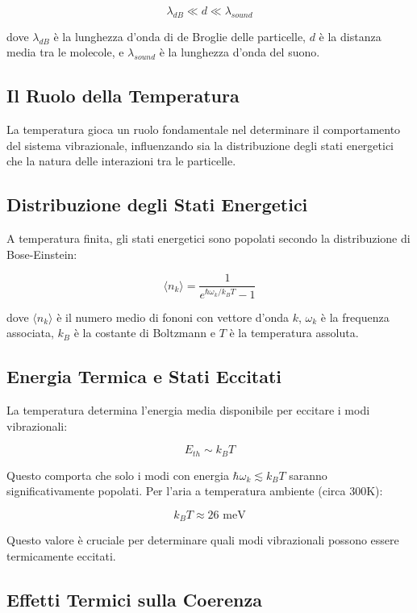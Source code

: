 \documentclass{gs-adonis}
\begin{document}
\[\lambda_{dB} \ll d \ll \lambda_{sound}\]

dove \(\lambda_{dB}\) è la lunghezza d'onda di de Broglie delle
particelle, \(d\) è la distanza media tra le molecole, e
\(\lambda_{sound}\) è la lunghezza d'onda del suono.

\subsection{Il Ruolo della
Temperatura}\label{il-ruolo-della-temperatura}

La temperatura gioca un ruolo fondamentale nel determinare il
comportamento del sistema vibrazionale, influenzando sia la
distribuzione degli stati energetici che la natura delle interazioni tra
le particelle.

\subsection{Distribuzione degli Stati
Energetici}\label{distribuzione-degli-stati-energetici}

A temperatura finita, gli stati energetici sono popolati secondo la
distribuzione di Bose-Einstein:

\[\langle n_k \rangle = \frac{1}{e^{\hbar\omega_k/k_BT} - 1}\]

dove \(\langle n_k \rangle\) è il numero medio di fononi con vettore
d'onda \(k\), \(\omega_k\) è la frequenza associata, \(k_B\) è la
costante di Boltzmann e \(T\) è la temperatura assoluta.

\subsection{Energia Termica e Stati
Eccitati}\label{energia-termica-e-stati-eccitati}

La temperatura determina l'energia media disponibile per eccitare i modi
vibrazionali:

\[E_{th} \sim k_BT\]

Questo comporta che solo i modi con energia
\(\hbar\omega_k \lesssim k_BT\) saranno significativamente popolati. Per
l'aria a temperatura ambiente (circa 300K):

\[k_BT \approx 26 \text{ meV}\]

Questo valore è cruciale per determinare quali modi vibrazionali possono
essere termicamente eccitati.

\subsection{Effetti Termici sulla
Coerenza}\label{effetti-termici-sulla-coerenza}
\end{document}

